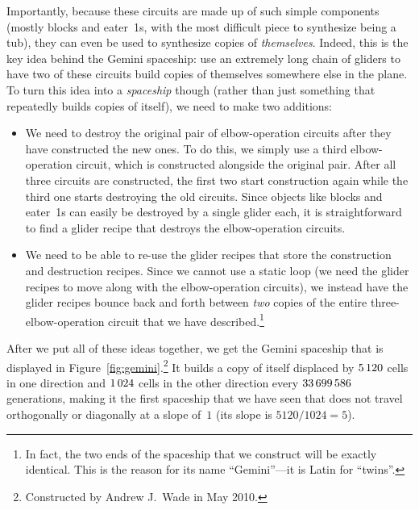 Importantly, because these circuits are made up of such simple components (mostly blocks and eater~1s, with the most difficult piece to synthesize being a tub), they can even be used to synthesize copies of \emph{themselves}. Indeed, this is the key idea behind the Gemini spaceship: use an extremely long chain of gliders to have two of these circuits build copies of themselves somewhere else in the plane. To turn this idea into a \emph{spaceship} though (rather than just something that repeatedly builds copies of itself), we need to make two additions:\smallskip

\begin{itemize}
	\item[1)] We need to destroy the original pair of elbow-operation circuits after they have constructed the new ones. To do this, we simply use a third elbow-operation circuit, which is constructed alongside the original pair. After all three circuits are constructed, the first two start construction again while the third one starts destroying the old circuits. Since objects like blocks and eater~1s can easily be destroyed by a single glider each, it is straightforward to find a glider recipe that destroys the elbow-operation circuits.\smallskip
	
	\item[2)] We need to be able to re-use the glider recipes that store the construction and destruction recipes. Since we cannot use a static loop (we need the glider recipes to move along with the elbow-operation circuits), we instead have the glider recipes bounce back and forth between \emph{two} copies of the entire three-elbow-operation circuit that we have described.\footnote{In fact, the two ends of the spaceship that we construct will be exactly identical. This is the reason for its name ``Gemini''---it is Latin for ``twins''.}\smallskip
\end{itemize}

After we put all of these ideas together, we get the Gemini spaceship that is displayed in Figure~\ref{fig:gemini}.\footnote{Constructed by Andrew J.~Wade in May 2010.} It builds a copy of itself displaced by $5{\,}120$ cells in one direction and $1{\,}024$ cells in the other direction every $33{\,}699{\,}586$ generations, making it the first spaceship that we have seen that does not travel orthogonally or diagonally at a slope of~$1$ (its slope is $5120/1024 = 5$).


